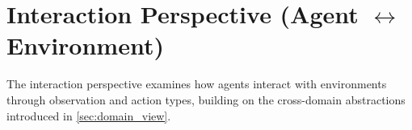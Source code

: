 \section{\texorpdfstring{Interaction Perspective (Agent $\leftrightarrow$ Environment)}{Interaction Perspective (Agent <-> Environment)}}\label{sec:interaction_view}

The interaction perspective examines how agents interact with environments through observation and action types, building on the cross-domain abstractions introduced in \cref{sec:domain_view}.



